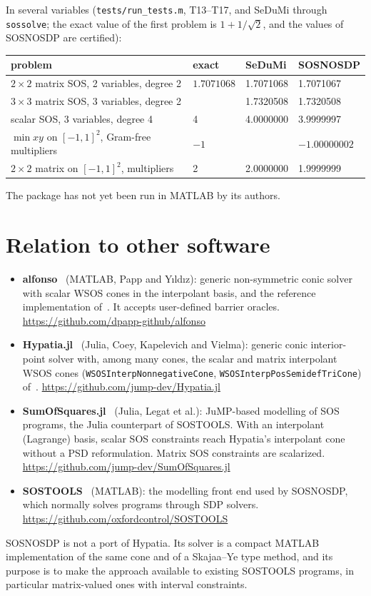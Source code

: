 \documentclass[11pt,a4paper]{article}
\newcommand{\code}[1]{\texttt{#1}}
\begin{document}
In several variables (\code{tests/run\_tests.m}, T13--T17, and SeDuMi through \code{sossolve}; the exact value of the first problem is $1+1/\sqrt2$, and the values of SOSNOSDP are certified):
\begin{center}\small
\begin{tabular}{llll}
\toprule
problem & exact & SeDuMi & SOSNOSDP\\
\midrule
$2\times2$ matrix SOS, 2 variables, degree 2 & $1.7071068$ & 1.7071068 & 1.7071067\\
$3\times3$ matrix SOS, 3 variables, degree 2 & & 1.7320508 & 1.7320508\\
scalar SOS, 3 variables, degree 4 & 4 & 4.0000000 & 3.9999997\\
$\min xy$ on $[-1,1]^2$, Gram-free multipliers & $-1$ & & $-1.00000002$\\
$2\times2$ matrix on $[-1,1]^2$, multipliers & 2 & 2.0000000 & 1.9999999\\
\bottomrule
\end{tabular}
\end{center}
The package has not yet been run in MATLAB by its authors.

\section{Relation to other software}\label{sec:related}
\begin{itemize}[itemsep=2pt]
\item \textbf{alfonso}~\cite{alfonso} (MATLAB, Papp and Y{\i}ld{\i}z): generic non-symmetric conic solver with scalar WSOS cones in the interpolant basis, and the reference implementation of~\cite{PappYildiz2019}. It accepts user-defined barrier oracles. \url{https://github.com/dpapp-github/alfonso}
\item \textbf{Hypatia.jl}~\cite{CKV2022,CKV2023} (Julia, Coey, Kapelevich and Vielma): generic conic interior-point solver with, among many cones, the scalar and matrix interpolant WSOS cones (\code{WSOSInterpNonnegativeCone}, \code{WSOSInterpPosSemidefTriCone}) of~\cite{KCV2023}. \url{https://github.com/jump-dev/Hypatia.jl}
\item \textbf{SumOfSquares.jl}~\cite{SumOfSquares} (Julia, Legat et al.): JuMP-based modelling of SOS programs, the Julia counterpart of SOSTOOLS. With an interpolant (Lagrange) basis, scalar SOS constraints reach Hypatia's interpolant cone without a PSD reformulation. Matrix SOS constraints are scalarized. \url{https://github.com/jump-dev/SumOfSquares.jl}
\item \textbf{SOSTOOLS}~\cite{SOSTOOLS} (MATLAB): the modelling front end used by SOSNOSDP, which normally solves programs through SDP solvers. \url{https://github.com/oxfordcontrol/SOSTOOLS}
\end{itemize}
SOSNOSDP is not a port of Hypatia. Its solver is a compact MATLAB implementation of the same cone and of a Skajaa--Ye type method, and its purpose is to make the approach available to existing SOSTOOLS programs, in particular matrix-valued ones with interval constraints.
\end{document}
